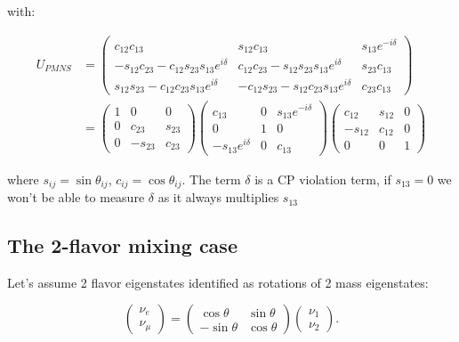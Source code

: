 \documentclass[
  letterpaper,
  DIV=11,
  numbers=noendperiod]{scrreprt}
\begin{document}
with:

\[
\begin{aligned}
U_{PMNS} &= 
\begin{pmatrix} 
c_{12}c_{13} & s_{12}c_{13} & s_{13}e^{-i\delta} \\
-s_{12}c_{23} - c_{12}s_{23}s_{13}e^{i\delta} & c_{12}c_{23} - s_{12}s_{23}s_{13}e^{i\delta} & s_{23}c_{13} \\
s_{12}s_{23} - c_{12}c_{23}s_{13}e^{i\delta} & -c_{12}s_{23} - s_{12}c_{23}s_{13}e^{i\delta} & c_{23}c_{13} \end{pmatrix} \\
&= \begin{pmatrix} 
1 & 0 & 0 \\ 0 & c_{23} & s_{23} \\ 0 & -s_{23} & c_{23} 
\end{pmatrix}
\begin{pmatrix} 
c_{13} & 0 & s_{13}e^{-i\delta} \\ 0 & 1 & 0 \\ -s_{13}e^{i\delta} & 0 & c_{13} 
\end{pmatrix}
\begin{pmatrix} 
c_{12} & s_{12} & 0 \\ -s_{12} & c_{12} & 0 \\ 0 & 0 & 1 
\end{pmatrix}
\end{aligned}
\]

where \(s_{ij} = \sin \theta_{ij}\), \(c_{ij} = \cos \theta_{ij}\). The
term \(\delta\) is a CP violation term, if \(s_{13} = 0\) we won't be
able to measure \(\delta\) as it always multiplies \(s_{13}\)

\subsection*{The 2-flavor mixing case}\label{the-2-flavor-mixing-case}

Let's assume 2 flavor eigenstates identified as rotations of 2 mass
eigenstates:

\[\begin{pmatrix} \nu_e \\ \nu_\mu \end{pmatrix} = \begin{pmatrix} \cos\theta & \sin\theta \\ -\sin\theta & \cos\theta \end{pmatrix} \begin{pmatrix} \nu_1 \\ \nu_2 \end{pmatrix}.\]
\end{document}
